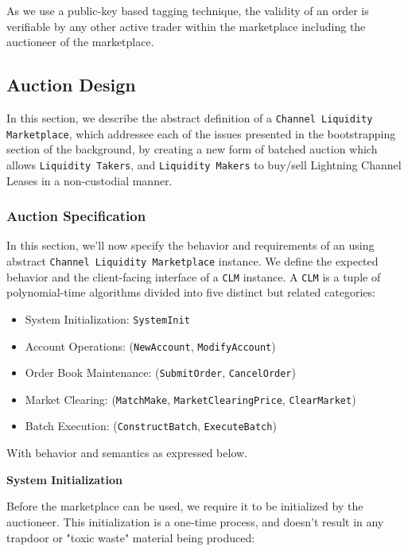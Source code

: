 \documentclass[12pt,a4paper]{article}
\theoremstyle{definition}
\begin{document}
As we use a public-key based tagging technique, the validity of an order is
verifiable by any other active trader within the marketplace including the
auctioneer of the marketplace.


\subsection{Auction Design}

In this section, we describe the abstract definition of a \texttt{Channel
Liquidity Marketplace}, which addressee each of the issues presented in the
bootstrapping section of the background, by creating a new form of batched
auction which allows \texttt{Liquidity Takers}, and \texttt{Liquidity Makers}
to buy/sell Lightning Channel Leases in a non-custodial manner.

\subsubsection{Auction Specification}

In this section, we'll now specify the behavior and requirements of an using abstract
\texttt{Channel Liquidity Marketplace} instance. We define the expected
behavior and the client-facing interface of a \texttt{CLM} instance. A
\texttt{CLM} is a tuple of polynomial-time algorithms divided into five
distinct but related categories:
\begin{itemize}
    \item System Initialization: \texttt{SystemInit}
    \item Account Operations: (\texttt{NewAccount}, \texttt{ModifyAccount})
    \item Order Book Maintenance: (\texttt{SubmitOrder}, \texttt{CancelOrder})
    \item Market Clearing: (\texttt{MatchMake}, \texttt{MarketClearingPrice}, \texttt{ClearMarket})
    \item Batch Execution: (\texttt{ConstructBatch}, \texttt{ExecuteBatch})
\end{itemize}


With behavior and semantics as expressed below. \\

\begin{center}
    \textbf{System Initialization}
\end{center}

Before the marketplace can be used, we require it to be initialized by the
auctioneer. This initialization is a one-time process, and doesn't result in
any trapdoor or "toxic waste" material being produced: \\
\end{document}
